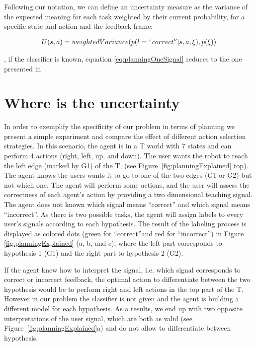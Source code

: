 Following our notation, we can define an uncertainty measure as the variance of the expected meaning for each task weighted by their current probability, for a specific state and action and the feedback frame:

\begin{eqnarray}
U(s,a) = weightedVariance(p(l = ``correct''| s, a, \xi), p(\xi))
\end{eqnarray}



\cite{lopes2009active}, if the classifier is known, equation \ref{eq:planningOneSignal} reduces to the one presented in \cite{macl11simul} 




\section{Where is the uncertainty}


In order to exemplify the specificity of our problem in terms of planning we present a simple experiment and compare the effect of different action selection strategies. In this scenario, the agent is in a T world with 7 states and can perform 4 actions (right, left, up, and down). The user wants the robot to reach the left edge (marked by G1) of the T, (see Figure~\ref{fig:planningExplained} top). The agent knows the users wants it to go to one of the two edges (G1 or G2) but not which one. The agent will perform some actions, and the user will assess the correctness of each agent's action by providing a two dimensional teaching signal. The agent does not known which signal means ``correct'' and which signal means ``incorrect''. As there is two possible tasks, the agent will assign labels to every user's signals according to each hypothesis. The result of the labeling process is displayed as colored dots (green for ``correct''and red for ``incorrect'') in Figure \ref{fig:planningExplained} (a, b, and c), where the left part corresponds to hypothesis 1 (G1) and the right part to hypothesis 2 (G2).

If the agent knew how to interpret the signal, i.e. which signal corresponds to correct or incorrect feedback, the optimal action to differentiate between the two hypothesis would be to perform right and left actions in the top part of the T. However in our problem the classifier is not given and the agent is building a different model for each hypothesis. As a results, we end up with two opposite interpretations of the user signal, which are both as valid (see Figure~\ref{fig:planningExplained}a) and do not allow to differentiate between hypothesis.

